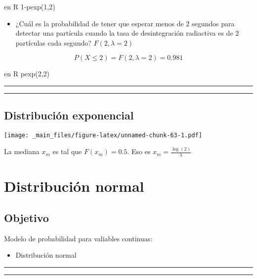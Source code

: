 \documentclass[
]{book}
\providecommand{\tightlist}{%
  \setlength{\itemsep}{0pt}\setlength{\parskip}{0pt}}
\begin{document}
en R 1-pexp(1,2)

\begin{itemize}
\tightlist
\item
  ¿Cuál es la probabilidad de tener que esperar menos de \(2\) segundos para detectar una partícula cuando la tasa de desintegración radiactiva es de \(2\) partículas cada segundo? \(F(2,\lambda=2)\)
\end{itemize}

\[P(X\le 2)=F(2,\lambda=2)=0.981\]

en R pexp(2,2)

\begin{center}\rule{0.5\linewidth}{0.5pt}\end{center}

\begin{center}\rule{0.5\linewidth}{0.5pt}\end{center}

\hypertarget{distribuciuxf3n-exponencial-2}{%
\section{Distribución exponencial}\label{distribuciuxf3n-exponencial-2}}

\texttt{[image: \_main\_files/figure-latex/unnamed-chunk-63-1.pdf]}

La mediana \(x_m\) es tal que \(F(x_m)=0.5\). Eso es \(x_m=\frac{\log(2)}{\lambda}\)

\hypertarget{distribuciuxf3n-normal}{%
\chapter{Distribución normal}\label{distribuciuxf3n-normal}}

\hypertarget{objetivo-8}{%
\section{Objetivo}\label{objetivo-8}}

Modelo de probabilidad para valiables continuas:

\begin{itemize}
\tightlist
\item
  Distribución normal
\end{itemize}

\begin{center}\rule{0.5\linewidth}{0.5pt}\end{center}

\begin{center}\rule{0.5\linewidth}{0.5pt}\end{center}
\end{document}
